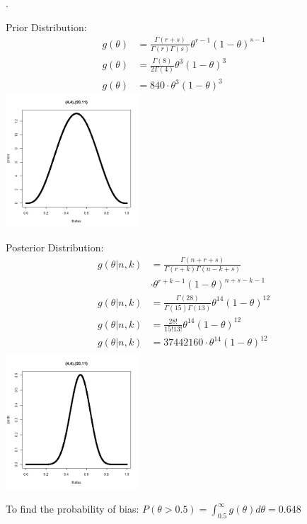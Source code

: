 \documentclass[12pt]{article}
\newenvironment{problem}[2][Problem]{\begin{trivlist}
\item[\hskip \labelsep {\bfseries #1}\hskip \labelsep {\bfseries #2.}]}{\end{trivlist}}
\begin{document}
\begin{problem}{(4,4),(20,11)}.
\begin{multicols}{2}
 Prior Distribution: 
\begin{align*}
  g(\theta) &= \frac{\Gamma (r+s)}{\Gamma (r) \Gamma (s)} \theta^{r-1}(1-\theta)^{s-1} \\
    g(\theta) &= \frac{\Gamma (8)}{2\Gamma (4)} \theta^{3}(1-\theta)^{3} \\
    g(\theta) &= 840 \cdot \theta^{3}(1-\theta)^{3}
\end{align*}
\columnbreak
  \includegraphics[width=5cm]{442011_prior2.png}
 \label{fig:boat1}
\end{multicols}

\begin{multicols}{2}
Posterior Distribution: 
\begin{align*}
    g(\theta | n,k) &= \frac{\Gamma (n+r+s)}{\Gamma (r+k) \Gamma (n-k+s)} \\
    & \cdot \theta^{r+k-1}(1-\theta)^{n+s-k-1} \\
    g(\theta | n,k) &= \frac{\Gamma (28)}{\Gamma (15) \Gamma (13)} \theta^{14}(1-\theta)^{12} \\
    g(\theta | n,k) &= \frac{28!}{15!13!} \theta^{14}(1-\theta)^{12} \\
    g(\theta | n,k) &= 37442160 \cdot \theta^{14}(1-\theta)^{12} \\
\end{align*}
\columnbreak
  \includegraphics[width=5cm]{442011_post.png}
 \label{fig:boat1}
\end{multicols}

To find the probability of bias: $P(\theta > 0.5) = \int_{0.5}^{\infty} g(\theta ) d\theta =  0.648$

\end{problem}
\newpage
\end{document}
